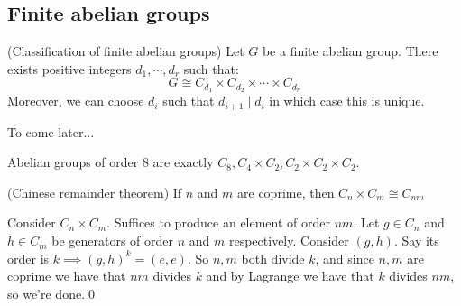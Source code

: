 \documentclass{article}
\begin{document}
\subsection {Finite abelian groups}
\begin{theorem}
	(Classification of finite abelian groups) Let $ G $ be a finite abelian group. There exists positive integers $ d_1,\cdots, d_r $ such that:
	\[
		G\cong C_{d_1}\times C_{d_2}\times \cdots\times C_{d_r}
	\]
	Moreover, we can choose $ d_i $ such that $ d_{i+1}\mid d_i $ in which case this is unique.
\end{theorem}
\pf To come later...

\par
Abelian groups of order 8 are exactly $ C_8, C_4\times C_2, C_2\times C_2\times C_2 $.
\begin{lemma}
	(Chinese remainder theorem) If $ n $ and $ m $ are coprime, then $ C_n\times C_m\cong C_{nm} $
\end{lemma}
\pf Consider $ C_n\times C_m $. Suffices to produce an element of order $ nm $. Let $ g\in C_n $ and $ h\in C_m $ be generators of order $ n $ and $ m $ respectively. Consider $ (g,h) $. Say its order is $ k\implies (g,h)^k=(e,e) $. So $ n,m $ both divide $ k $, and since $ n,m $ are coprime we have that $ nm $ divides $ k $ and by Lagrange we have that $ k $ divides $ nm $, so we're done.\qed
\end{document}
